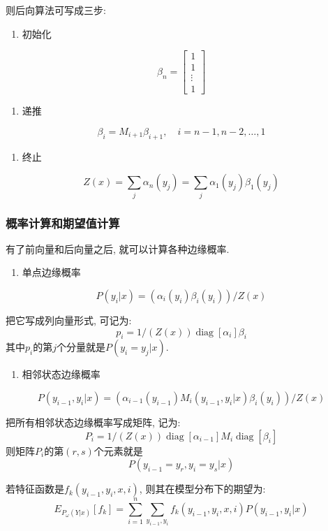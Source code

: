 则后向算法可写成三步:

\begin{enumerate}
\item[1.] 初始化
\end{enumerate}
\[
\beta_n = \begin{bmatrix}1 \\ 1 \\ \vdots \\ 1\end{bmatrix}
\]

\begin{enumerate}
\item[2.] 递推
\end{enumerate}
\[
\beta_i = M_{i+1} \beta_{i+1}, \quad i = n-1, n-2, \dots, 1
\]

\begin{enumerate}
\item[3.] 终止
\end{enumerate}
\[
Z(x) = \sum_j \alpha_n (y_j) = \sum_j \alpha_1(y_j) \beta_1(y_j)
\]


\subsubsection{概率计算和期望值计算}


有了前向量和后向量之后, 就可以计算各种边缘概率.

\begin{enumerate}
\item[1.] 单点边缘概率
\end{enumerate}
\[
P(y_i | x) = (\alpha_i (y_i) \beta_i (y_i)) / Z(x)
\]

把它写成列向量形式, 可记为:
\[
p_i = 1/(Z(x)) \operatorname{diag}[\alpha_i] \beta_i
\]
其中$p_i$的第$j$个分量就是$P(y_i = y_j | x)$.

\begin{enumerate}
\item[2.] 相邻状态边缘概率
\end{enumerate}
\[
P(y_{i-1}, y_i | x)
    = (\alpha_{i-1}(y_{i-1}) M_i (y_{i-1}, y_i | x) \beta_i (y_i)) / Z(x)
\]

把所有相邻状态边缘概率写成矩阵, 记为:
\[
P_i = 1/(Z(x)) \operatorname{diag}[\alpha_{i-1}] M_i \operatorname{diag}[\beta_i]
\]
则矩阵$P_i$的第$(r, s)$个元素就是
\[
P(y_{i-1}=y_r, y_i=y_s | x)
\]

若特征函数是$f_k (y_{i-1}, y_i, x, i)$, 则其在模型分布下的期望为:
\[
E_{P_{\omega} (Y|x)}[f_k]
    = \sum_{i=1}^n \sum_{y_{i-1}, y_i}
      f_k (y_{i-1}, y_i, x, i) P(y_{i-1}, y_i | x)
\]

